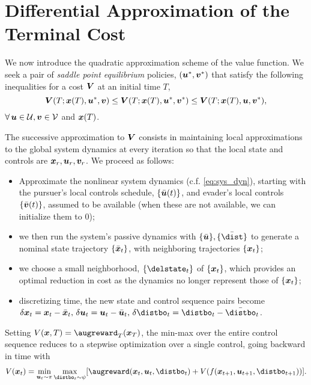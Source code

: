 \section{Differential Approximation of the Terminal Cost}
\label{sec:methods}
%
We now introduce the quadratic approximation scheme of the value function.
 We seek a pair of \emph{saddle point equilibrium} policies, $(\bm{u}^*, \bm{v}^*)$ that satisfy the following inequalities for a cost $\bm{V}$ at an initial time $T$,
\[
\bm{V}(T; \bm{x}(T), \bm{u}^*, \bm{v}) \leq \bm{V}(T; \bm{x}(T), \bm{u}^*, \bm{v}^*) \leq \bm{V}(T; \bm{x}(T), \bm{u}, \bm{v}^*),
\]
$ \forall \, \bm{u} \in \mathcal{U}, \bm{v} \in \mathcal{V}$ and $\bm{x}(T)$.
%

The successive approximation to $\bm{V}$ consists in  maintaining local approximations to the global system dynamics at every iteration so that the local state and controls are $\bm{x}_r, \bm{u}_r, \bm{v}_r$. We proceed as follows:
%
\begin{itemize}
	\item Approximate the nonlinear system dynamics (c.f. \eqref{eq:sys_dyn}), starting with the pursuer's local controls schedule, $\{ \bar {\bm{u}}(t)\}$, and evader's local controls $\{ \bar {\bm{v}}(t) \}$, assumed to be available (when these are not available, we can initialize them to $0$);
	\item  we then run the system's passive dynamics with $\{\bar{\control}\}, \{\bar {\dist} \}$ to generate  a nominal state trajectory $ \{\bar{\bm{x}}_t\}$, with neighboring trajectories $\{ \bm{x}_t \}$; %
	\item we choose a small neighborhood, $\{\delstate_t\}$ of $\{\bm{x}_t\}$, which provides an optimal reduction in cost as the dynamics no longer represent those of $\{\bm{x}_t\}$;
	\item  discretizing time, the new state and control sequence pairs become $\delta \state_\tidx = \state_\tidx - \bar \state_\tidx, \,
	\delta \control_\tidx = \control_\tidx - \bar \control_\tidx, \,
	\delta \distbo_\tidx = \distbo_\tidx - \bar \distbo_\tidx$.
\end{itemize}
%
Setting $V(\state, T) = \augreward_{T}(\state_{T})$, the min-max over the entire control sequence reduces to a stepwise optimization over a single control, going backward in time with %
\begin{align}
	V(\state_\tidx) = \min_{\control_\tidx \sim \pi} \max_{\distbo_\tidx \sim \psi} [\augreward(\state_\tidx, \control_\tidx, \distbo_\tidx) + V(f(\state_{\tidx+1}, \control_{\tidx+1}, \distbo_{\tidx+1}))]. \nonumber
\end{align}


